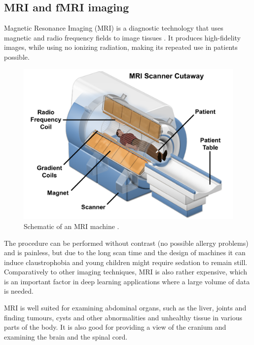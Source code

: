 	
	\subsection{MRI and fMRI imaging}
	
	Magnetic Resonance Imaging (MRI) is a diagnostic technology that uses magnetic and radio frequency fields to image tissues \cite{atkins2002fully}. It produces high-fidelity images, while using no ionizing radiation, making its repeated use in patients possible. 
	
	\begin{figure}[!h]
		\centering
		\includegraphics[width=\textwidth]{figures/mri_scanner.png}
		\caption{Schematic of an MRI machine \cite{mripage}.}
	\end{figure}
	
	The procedure can be performed without contrast (no possible allergy problems) and is painless, but due to the long scan time and the design of machines it can induce claustrophobia and young children might require sedation to remain still. Comparatively to other imaging techniques, MRI is also rather expensive, which is an important factor in deep learning applications where a large volume of data is needed.
	
	MRI is well suited for examining abdominal organs, such as the liver, joints and finding tumours, cysts and other abnormalities and unhealthy tissue in various parts of the body. It is also good for providing a view of the cranium and examining the brain and the spinal cord.
	
